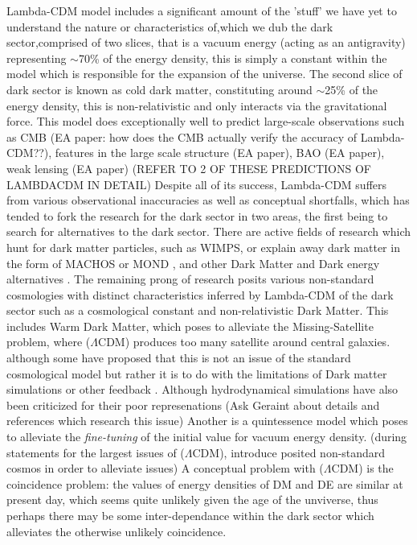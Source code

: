 \documentclass[a4paper,fleqn,usenatbib]{mnras}
\begin{document}
Lambda-CDM model includes a significant amount of the 'stuff' we have yet to understand the nature or characteristics of,which we dub the dark sector,comprised of two slices, that is a vacuum energy (acting as an antigravity) representing $\sim$70\% of the energy density, this is simply a constant within the model which is responsible for the expansion of the universe. The second slice of dark sector is known as cold dark matter, constituting around $\sim$25\% of the energy density, this is non-relativistic and only interacts via the gravitational force. 
This model does exceptionally well to predict large-scale observations such as CMB \citep{Bennett_13,Plank_14b,Plank_16} (EA paper: how does the CMB actually verify the accuracy of Lambda-CDM??), features in the large scale structure (EA paper), BAO (EA paper), weak lensing (EA paper) (REFER TO 2 OF THESE PREDICTIONS OF LAMBDACDM IN DETAIL)
Despite all of its success, Lambda-CDM suffers from various observational inaccuracies as well as conceptual shortfalls, which has tended to fork the research for the dark sector in two areas, the first being to search for alternatives to the dark sector. There are active fields of research which hunt for dark matter particles, such as WIMPS, or explain away dark matter in the form of MACHOS \citep{Alcock_00} or MOND \citep{Milgrom_15}, and other Dark Matter and Dark energy alternatives \citep[e.g][]{Mannheim_06}. The remaining prong of research posits various non-standard cosmologies with distinct characteristics inferred by Lambda-CDM of the dark sector such as a cosmological constant and non-relativistic Dark Matter. 
This includes Warm Dark Matter, which poses to alleviate the Missing-Satellite problem, where ($\Lambda$CDM) produces too many satellite around central galaxies. although some have proposed that this is not an issue of the standard cosmological model but rather it is to do with the limitations of Dark matter simulations \citep{Wetzel_16} or other feedback \citep[e.g][]{Bullock_00}. Although hydrodynamical simulations have also been criticized for their poor represenations (Ask Geraint about details and references which research this issue)
Another is a quintessence model which poses to alleviate the \textit{fine-tuning} of the initial value for vacuum energy density.
(during statements for the largest issues of ($\Lambda$CDM), introduce posited non-standard cosmos in order to alleviate issues)
A conceptual problem with ($\Lambda$CDM) is the coincidence problem:  the values of energy densities of DM and DE are similar at present day, which seems quite unlikely given the age of the unviverse, thus perhaps there may be some inter-dependance within the dark sector which alleviates the otherwise unlikely coincidence. 
\end{document}
